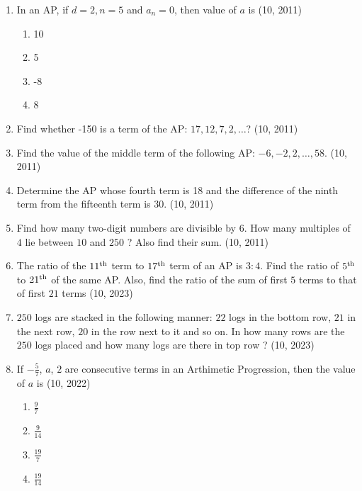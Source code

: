 \begin{enumerate}[label=\thesubsection.\arabic*,ref=\thesubsection.\theenumi,itemsep=1pt]
 \item In an AP, if $d=2, n=5$ and $a_n=0$, then value of $a$ is
    \hfill (10,  2011)
\begin{multicols}{4}
    \begin{enumerate}
         \item 10
         \item 5
         \item -8
         \item 8
    \end{enumerate}
\end{multicols}
 \item Find whether -150 is a term of the AP: $17, 12, 7, 2,\dots$?
    \hfill (10,  2011) \item Find the value of the middle term of the following AP: $- 6, -2, 2,\dots, 58.$
   \hfill (10,  2011) \item Determine the AP whose fourth term is 18 and the difference of the ninth term from the fifteenth term is 30.
\hfill (10,  2011) \item Find how many two-digit numbers are divisible by $6$.
 How many multiples of $4$ lie between $10$ and $250$ ? Also find their sum.
    \hfill (10,  2011)
         \item The ratio of the $11\textsuperscript{th}$ term to $17\textsuperscript{th}$ term of an AP is $3:4$. Find the ratio of $5\textsuperscript{th}$ to $21\textsuperscript{th}$ of the same AP. Also, find the ratio of the sum of first $5$ terms to that of first $21$ terms
        \hfill (10,  2023) \item $250$ logs are stacked in the following manner:
        $22$ logs in the bottom row, $21$ in the next row, $20$ in the row next to it and so on. In how many rows are the $250$ logs placed and how many logs are there in top row ?
\hfill (10,  2023)
 \item If $-\frac{5}{7}$, $a$, $2$ are consecutive terms in an Arthimetic Progression, then the value of $a$ is 
    \hfill (10,  2022)
    \begin{multicols}{4}
\begin{enumerate}    
\item $\frac{9}{7}$
 \item $\frac{9}{14}$
 \item $\frac{19}{7}$
 \item $\frac{19}{14}$
    \end{enumerate}

\end{multicols}
\end{enumerate}
